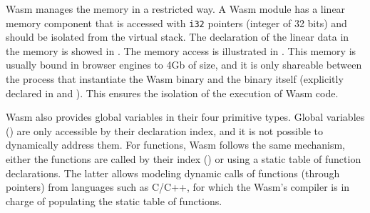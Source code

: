 \begin{code}
    \begin{minipage}[t]{0.45\linewidth}
%
\end{minipage}\hspace{10mm}
\begin{minipage}[t]{0.46\linewidth}
%
%
\end{minipage}






\end{code}

Wasm  manages the memory in a restricted way. A Wasm  module has a linear memory component that is accessed with \texttt{i32} pointers (integer of 32 bits) and should be isolated from the virtual stack. The declaration of the linear data in the memory is showed in . The memory access is illustrated in . This memory is usually bound in browser engines to 4Gb of size, and it is only shareable between the process that instantiate the Wasm  binary and the binary itself (explicitly declared in  and ). This ensures the isolation of the execution of Wasm  code. 

Wasm  also provides global variables in their four primitive types. Global variables () are only accessible by their declaration index, and it is not possible to dynamically address them. For functions, Wasm  follows the same mechanism, either the functions are called by their index () or using a static table of function declarations. The latter allows modeling dynamic calls of functions (through pointers) from languages such as C/C++, for which the Wasm's compiler is in charge of populating the static table of functions.


